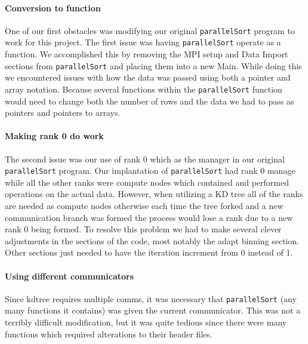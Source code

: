 \documentclass{article}
\begin{document}

\paragraph{Conversion to function}
One of our first obstacles was modifying our original \texttt{parallelSort}  program to work for this project. The first issue was having \texttt{parallelSort} operate as a function. We accomplished this by removing the MPI setup and Data Import sections from \texttt{parallelSort} and placing them into a new Main. While doing this we encountered issues with how the data was passed using both a pointer and array notation. Because several functions within the \texttt{parallelSort} function would need to change both the number of rows and the data we had to pass as pointers and pointers to arrays. 


\paragraph{Making rank 0 do work}
The second issue was our use of rank 0 which as the manager in our original \texttt{parallelSort} program. Our implantation of \texttt{parallelSort} had rank 0 manage while all the other ranks were compute nodes which contained and performed operations on the actual data. However, when utilizing a KD tree all of the ranks are needed as compute nodes otherwise each time the tree forked and a new communication branch was formed the process would lose a rank due to a new rank 0 being formed. To resolve this problem we had to make several clever adjustments in the sections of the code, most notably the adapt binning section. Other sections just needed to have the iteration increment from 0 instead of 1.

\paragraph{Using different communicators}
Since kdtree requires multiple comms, it was necessary that \texttt{parallelSort} (any many functions it contains) was given the current communicator. This was not a terribly difficult modification, but it was quite tedious since there were many functions which required alterations to their header files.
\end{document}
